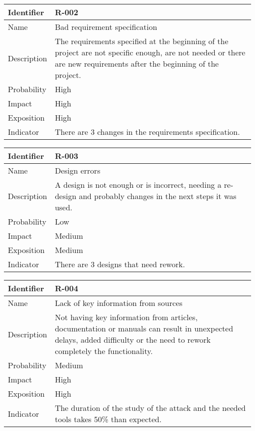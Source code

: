 \begin{table}[H]
	\begin{tabularx}{\textwidth}{|l|X|}
		\hline
		\rowcolor{gray!30}
		Identifier & \textbf{R-002} \\ \hline
		Name & Bad requirement specification\\ \hline
		Description & The requirements specified at the beginning of the project are not specific enough, are not needed or there are new requirements after the beginning of the project. \\ \hline
		Probability & High\\ \hline
		Impact &  High\\ \hline
		Exposition &  High\\ \hline
		Indicator & There are 3 changes in the requirements specification.\\ \hline
	\end{tabularx}
\end{table}



\begin{table}[H]
	\begin{tabularx}{\textwidth}{|l|X|}
		\hline
		\rowcolor{gray!30}
		Identifier & \textbf{R-003} \\ \hline
		Name & Design errors\\ \hline
		Description & A design is not enough or is incorrect, needing a re-design and probably changes in the next steps it was used. \\ \hline
		Probability & Low\\ \hline
		Impact &  Medium\\ \hline
		Exposition & Medium\\ \hline
		Indicator & There are 3 designs that need rework.\\ \hline
	\end{tabularx}
\end{table}



\begin{table}[H]
	\begin{tabularx}{\textwidth}{|l|X|}
		\hline
		\rowcolor{gray!30}
		Identifier & \textbf{R-004} \\ \hline
		Name & Lack of key information from sources\\ \hline
		Description & Not having key information from articles, documentation or manuals can result in unexpected delays, added difficulty or the need to rework completely the functionality.\\ \hline
		Probability & Medium\\ \hline
		Impact &  High\\ \hline
		Exposition &  High\\ \hline
		Indicator & The duration of the study of the attack and the needed tools takes 50\% than expected. \\ \hline
	\end{tabularx}
\end{table}



